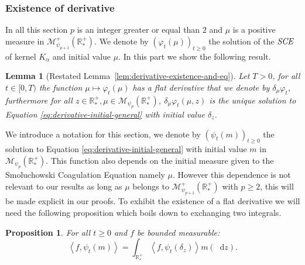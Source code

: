 \documentclass[11pt,a4paper]{article}
\newcommand{\RRP}{\mathbb{R}^+_*}
\newcommand{\MC}{\mathcal{M}}
\newcommand{\SCE}{\emph{SCE}}
\newcommand{\Proc}[1]{\left(#1\right)_{t\geq 0}}
\newcommand{\brac}[1]{\left\langle#1\right\rangle}
\newcommand{\dd}{\mathop{}\!\mathrm{d}}
\newtheorem{lemma}[theorem]{Lemma}
\newtheorem{proposition}[theorem]{Proposition}
\begin{document}
\subsubsection{Existence of derivative}
In all this section $p$ is an integer greater or equal than $2$ and $\mu$ is a positive measure in $\MC^+_{\psi_{p+1}}(\RRP)$. We denote by $\Proc{\varphi_t(\mu)}$ the solution of the $\SCE$ of kernel $K_\alpha$ and initial value $\mu$. In this part we show the following result.
\begin{lemma}[Restated Lemma~\ref{lem:derivative-existence-and-eq}]
    Let $T > 0$, for all $t \in [0,T)$ the function $ \mu \mapsto \varphi_t(\mu)$ has a flat derivative that we denote by $\delta_\mu\varphi_t$, furthermore for all $z \in \RRP, \mu \in \MC_{\psi_p}(\RRP)$, $\delta_\mu\varphi_t(\mu,z)$ is the unique solution to Equation \eqref{eq:derivative-initial-general} with initial value $\delta_z$.
\end{lemma}
We introduce a notation for this section, we denote by $\Proc{\psi_t(m)}$ the solution to Equation \eqref{eq:derivative-initial-general} with initial value $m$ in $\MC_{\psi_p}(\RRP)$. This function also depends on the initial measure given to the Smoluchowski Coagulation Equation namely $\mu$. However this dependence is not relevant to our results as long as $\mu$ belongs to $\MC^+_{\psi_{p+1}}(\RRP)$ with $p\geq 2$, this will be made explicit in our proofs. To exhibit the existence of a flat derivative we will need the following proposition which boils down to exchanging two integrals.
\begin{proposition}\label{prop:derivative-prop-fubini}
    For all $t \geq 0$ and $f$ be bounded measurable:
    \[\brac{f,\psi_t(m)} = \int_{\RRP} \brac{f,\psi_t\left(\delta_z\right)}m(\dd z).\]
\end{proposition}
\end{document}
